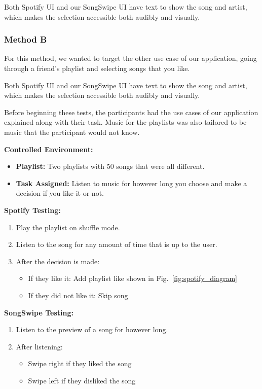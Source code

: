 \documentclass{article}
\begin{document}
    Both Spotify UI and our SongSwipe UI have text to show the song and artist, which makes the selection accessible both audibly and visually.

\subsubsection*{Method B}

For this method, we wanted to target the other use case of our application, going through a friend's playlist and selecting songs that you like.

Both Spotify UI and our SongSwipe UI have text to show the song and artist, which makes the selection accessible both audibly and visually.
    
Before beginning these tests, the participants had the use cases of our application explained along with their task. Music for the playlists was also tailored to be music that the participant would not know.

    \textbf{Controlled Environment:}
    
    \begin{itemize}
    \item \textbf{Playlist:} Two playlists with 50 songs that were all different.
    \item \textbf{Task Assigned:} Listen to music for however long you choose and make a decision if you like it or not.
    \end{itemize}

    \textbf{Spotify Testing:} 
    
    \begin{enumerate}
        \item Play the playlist on shuffle mode.
        \item Listen to the song for any amount of time that is up to the user.
        \item After the decision is made:
            \begin{itemize}
                \item If they like it: Add playlist like shown in Fig.~\ref{fig:spotify_diagram}
                \item If they did not like it: Skip song
            \end{itemize}
    \end{enumerate}

    \textbf{SongSwipe Testing:}
    
    \begin{enumerate}
        \item Listen to the preview of a song for however long.
        \item After listening:
            \begin{itemize}
                \item Swipe right if they liked the song
                \item Swipe left if they disliked the song
            \end{itemize}
    \end{enumerate}
\end{document}
